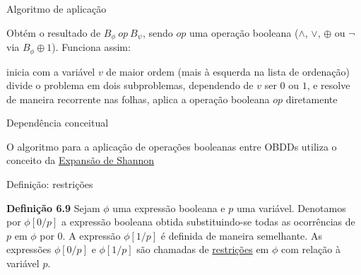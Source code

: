\expandafter\documentclass\expandafter[table, usenames, svgnames, dvipsnames,14pt, \classopts]{beamer}
\begin{document}
\begin{frame}{Algoritmo de aplicação}

    \small
    Obtém o resultado de $B_\phi~op~B_\psi$, sendo $op$ uma operação booleana ($\land$, $\lor$, $\oplus$ ou $\lnot$ via $B_\phi \oplus 1$). Funciona assim:

    \begin{outline}[enumerate]
        \1 inicia com a variável $v$ de maior ordem (mais à esquerda na lista de ordenação)
        \1 divide o problema em dois subproblemas, dependendo de $v$ ser $0$ ou $1$, e resolve de maneira recorrente
        \1 nas folhas, aplica a operação booleana $op$ diretamente
    \end{outline}

\end{frame}

\begin{frame}{Dependência conceitual}

    \centering
    O algoritmo para a aplicação de operações booleanas entre OBDDs utiliza o conceito da \underline{Expansão de Shannon}
    
\end{frame}

\begin{frame}{Definição: restrições}

    \begin{block}{\textbf{Definição 6.9}}
        Sejam $\phi$ uma expressão booleana e $p$ uma variável. Denotamos por $\phi[0/p]$ a expressão booleana obtida substituindo-se todas as ocorrências de $p$ em $\phi$ por $0$. A expressão $\phi[1/p]$ é definida de maneira semelhante. As expressões $\phi[0/p]$ e $\phi[1/p]$ são chamadas de \underline{restrições} em $\phi$ com relação à variável $p$.
    \end{block}

\end{frame}
\end{document}
